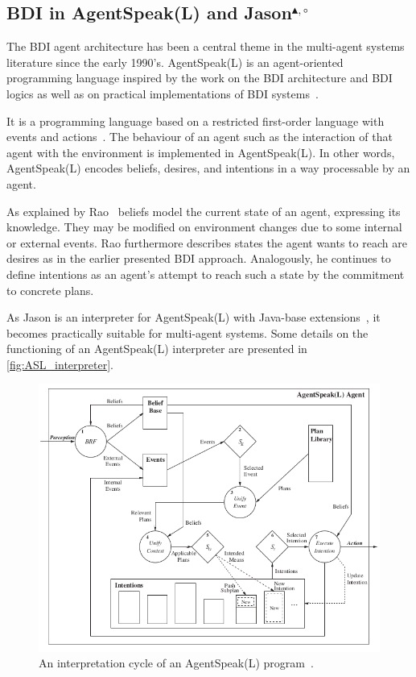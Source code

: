 \subsection[BDI in AgentSpeak(L) and Jason]{BDI in AgentSpeak(L) and Jason$^{\blacktriangle,\circ}$}
The BDI agent architecture has been a central theme in the multi-agent systems literature since the early 1990's.
AgentSpeak(L) is an agent-oriented programming language inspired by the work on the BDI architecture and BDI logics as well as on practical implementations of BDI systems~\cite{rafael_BDIAgent_2005}.

It is a programming language based on a restricted first-order language with events and actions~\cite{anand_AgentSpeak_1996}.
The behaviour of an agent such as the interaction of that agent with the environment is implemented in AgentSpeak(L).
In other words, AgentSpeak(L) encodes beliefs, desires, and intentions in a way processable by an agent.

As explained by Rao~\cite{anand_AgentSpeak_1996} beliefs model the current state of an agent, expressing its knowledge.
They may be modified on environment changes due to some internal or external events.
Rao furthermore describes states the agent wants to reach are desires as in the earlier presented BDI approach.
Analogously, he continues to define intentions as an agent's attempt to reach such a state by the commitment to concrete plans.

As Jason is an interpreter for AgentSpeak(L) with Java-base extensions~\cite{rafael_Javabased}, it becomes practically suitable for multi-agent systems.
Some details on the functioning of an AgentSpeak(L) interpreter are presented in \autoref{fig:ASL_interpreter}.
\begin{figure}[h]
  \centering
  \includegraphics[width=\textwidth]{images/BDI_ASL_interpreter}
  \caption{An interpretation cycle of an AgentSpeak(L) program~\cite{rafael_BDIAgent_2005}.}
  \label{fig:ASL_interpreter}
\end{figure}

